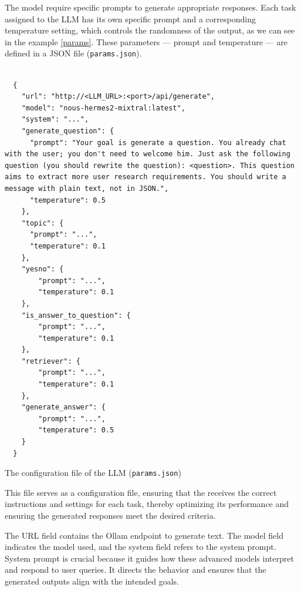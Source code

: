 
The model require specific prompts to generate appropriate responses. Each task assigned to the LLM has its own specific prompt and a corresponding temperature setting, which controls the randomness of the output, as we can see in the example \ref{params}. These parameters — prompt and temperature — are defined in a JSON file {\small\normalfont(\texttt{params.json})}. 

\begin{listing}[H]
  \begin{verbatim}
      
  {
    "url": "http://<LLM_URL>:<port>/api/generate",
    "model": "nous-hermes2-mixtral:latest",
    "system": "...",
    "generate_question": {
      "prompt": "Your goal is generate a question. You already chat with the user; you don't need to welcome him. Just ask the following question (you should rewrite the question): <question>. This question aims to extract more user research requirements. You should write a message with plain text, not in JSON.",
      "temperature": 0.5
    },
    "topic": {
      "prompt": "...",
      "temperature": 0.1
    },
    "yesno": {
        "prompt": "...",
        "temperature": 0.1
    },
    "is_answer_to_question": {
        "prompt": "...",
        "temperature": 0.1
    },
    "retriever": {
        "prompt": "...",
        "temperature": 0.1
    },
    "generate_answer": {
        "prompt": "...",
        "temperature": 0.5
    }
  }
  \end{verbatim}
  \caption{The configuration file of the LLM {\small\normalfont(\texttt{params.json})}}
  \label{params}
\end{listing}

This file serves as a configuration file, ensuring that the {\llm} receives the correct instructions and settings for each task, thereby optimizing its performance and ensuring the generated responses meet the desired criteria.

The URL field contains the Ollam {\llm} endpoint to generate text. The model field indicates the {\llm} model used, and the system field refers to the system prompt. System prompt is crucial because it guides how these advanced {\ai} models interpret and respond to user queries. It directs the {\llm} behavior and ensures that the generated outputs align with the intended goals. 

